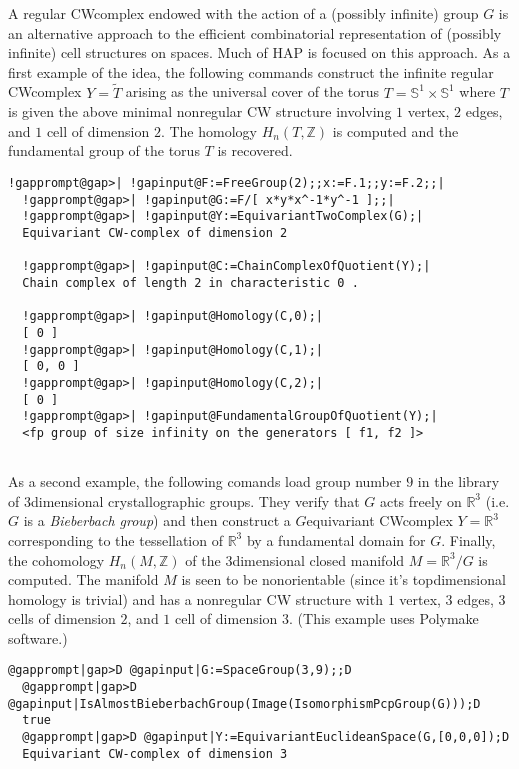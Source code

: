 \documentclass[a4paper,11pt]{report}
\begin{document}
{{A regular CW\texttt{}complex endowed with the action of a (possibly
infinite) group $G$ is an alternative approach to the efficient combinatorial representation of
(possibly infinite) cell structures on spaces. Much of \textsc{HAP} is focused on this approach. As a first example of the idea, the following
commands construct the infinite regular CW\texttt{}complex $Y=\widetilde T$ arising as the universal cover of the torus $T=\mathbb S^1\times \mathbb S^1$ where $T$ is given the above minimal non\texttt{}regular CW structure
involving $1$ vertex, $2$ edges, and $1$ cell of dimension $2$. The homology $H_n(T,\mathbb Z)$ is computed and the fundamental group of the torus $T$ is recovered. 
\begin{Verbatim}[commandchars=!@|,fontsize=\small,frame=single,label=Example]
  !gapprompt@gap>| !gapinput@F:=FreeGroup(2);;x:=F.1;;y:=F.2;;|
  !gapprompt@gap>| !gapinput@G:=F/[ x*y*x^-1*y^-1 ];;|
  !gapprompt@gap>| !gapinput@Y:=EquivariantTwoComplex(G);|
  Equivariant CW-complex of dimension 2
  
  !gapprompt@gap>| !gapinput@C:=ChainComplexOfQuotient(Y);|
  Chain complex of length 2 in characteristic 0 . 
  
  !gapprompt@gap>| !gapinput@Homology(C,0);|
  [ 0 ]
  !gapprompt@gap>| !gapinput@Homology(C,1);|
  [ 0, 0 ]
  !gapprompt@gap>| !gapinput@Homology(C,2);|
  [ 0 ]
  !gapprompt@gap>| !gapinput@FundamentalGroupOfQuotient(Y);|
  <fp group of size infinity on the generators [ f1, f2 ]>
  
\end{Verbatim}
 

As a second example, the following comands load group number $9$ in the library of $3$\texttt{}dimensional crystallographic groups. They verify that $G$ acts freely on $\mathbb R^3$ (i.e. $G$ is a \emph{Bieberbach group}) and then construct a $G$\texttt{}equivariant CW\texttt{}complex $Y=\mathbb R^3$ corresponding to the tessellation of $\mathbb R^3$ by a fundamental domain for $G$. Finally, the cohomology $H_n(M,\mathbb Z)$ of the $3$\texttt{}dimensional closed manifold $M=\mathbb R^3/G$ is computed. The manifold $M$ is seen to be non\texttt{}orientable (since it's
top\texttt{}dimensional homology is trivial) and has a
non\texttt{}regular CW structure with $1$ vertex, $3$ edges, $3$ cells of dimension $2$, and $1$ cell of dimension $3$. (This example uses Polymake software.) 
\begin{Verbatim}[commandchars=@|D,fontsize=\small,frame=single,label=Example]
  @gapprompt|gap>D @gapinput|G:=SpaceGroup(3,9);;D
  @gapprompt|gap>D @gapinput|IsAlmostBieberbachGroup(Image(IsomorphismPcpGroup(G)));D
  true
  @gapprompt|gap>D @gapinput|Y:=EquivariantEuclideanSpace(G,[0,0,0]);D
  Equivariant CW-complex of dimension 3
  

\end{Verbatim}}}
\end{document}
